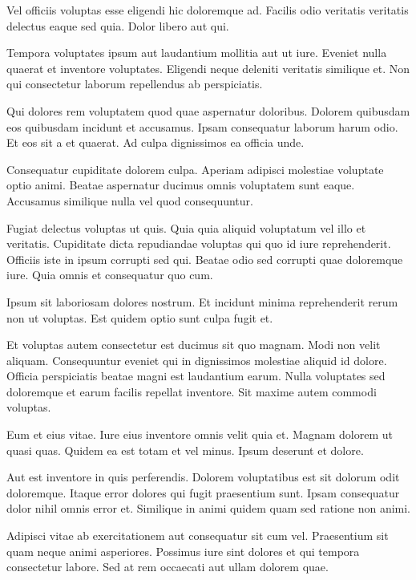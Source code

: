 \documentclass[a4paper]{article}
\begin{document}
\begin{multicols}{2}
Vel officiis voluptas esse eligendi hic doloremque ad. Facilis odio veritatis
    veritatis delectus eaque sed quia. Dolor libero aut qui.

Tempora voluptates ipsum aut laudantium mollitia aut ut iure. Eveniet nulla
    quaerat et inventore voluptates. Eligendi neque deleniti veritatis similique
    et. Non qui consectetur laborum repellendus ab perspiciatis.

Qui dolores rem voluptatem quod quae aspernatur doloribus. Dolorem quibusdam eos
    quibusdam incidunt et accusamus. Ipsam consequatur laborum harum odio. Et
    eos sit a et quaerat. Ad culpa dignissimos ea officia unde.

Consequatur cupiditate dolorem culpa. Aperiam adipisci molestiae voluptate optio
    animi. Beatae aspernatur ducimus omnis voluptatem sunt eaque. Accusamus
    similique nulla vel quod consequuntur.

Fugiat delectus voluptas ut quis. Quia quia aliquid voluptatum vel illo et
veritatis. Cupiditate dicta repudiandae voluptas qui quo id iure reprehenderit.
Officiis iste in ipsum corrupti sed qui. Beatae odio sed corrupti quae
doloremque iure. Quia omnis et consequatur quo cum.

Ipsum sit laboriosam dolores nostrum. Et incidunt minima reprehenderit rerum non
ut voluptas. Est quidem optio sunt culpa fugit et.

Et voluptas autem consectetur est ducimus sit quo magnam. Modi non velit
aliquam. Consequuntur eveniet qui in dignissimos molestiae aliquid id dolore.
Officia perspiciatis beatae magni est laudantium earum. Nulla voluptates sed
doloremque et earum facilis repellat inventore. Sit maxime autem commodi
voluptas.

Eum et eius vitae. Iure eius inventore omnis velit quia et. Magnam dolorem ut
quasi quas. Quidem ea est totam et vel minus. Ipsum deserunt et dolore.

Aut est inventore in quis perferendis. Dolorem voluptatibus est sit dolorum odit
doloremque. Itaque error dolores qui fugit praesentium sunt. Ipsam consequatur
dolor nihil omnis error et. Similique in animi quidem quam sed ratione non
animi.

Adipisci vitae ab exercitationem aut consequatur sit cum vel. Praesentium sit
quam neque animi asperiores. Possimus iure sint dolores et qui tempora
consectetur labore. Sed at rem occaecati aut ullam dolorem quae.

\end{multicols}
\end{document}
